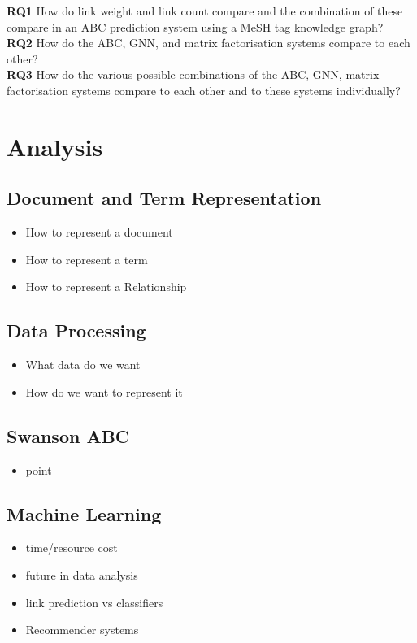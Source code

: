 \documentclass{l4proj}
\begin{document}
\textbf{RQ1} How do link weight and link count compare and the combination of these compare in an ABC prediction system using a MeSH tag knowledge graph? \\

\textbf{RQ2} How do the ABC, GNN, and matrix factorisation systems compare to each other? \\

\textbf{RQ3} How do the various possible combinations of the ABC, GNN, matrix factorisation systems compare to each other and to these systems individually? \\
\chapter{Analysis}
\section{Document and Term Representation}
\begin{itemize}
    \item How to represent a document
    \item How to represent a term
    \item How to represent a Relationship
\end{itemize}
\section{Data Processing}
\begin{itemize}
    \item What data do we want
    \item How do we want to represent it
\end{itemize}
\section{Swanson ABC}
\begin{itemize}
    \item point
\end{itemize}
\section{Machine Learning}
\begin{itemize}
    \item time/resource cost
    \item future in data analysis
    \item link prediction vs classifiers
    \item Recommender systems
\end{itemize}
\end{document}
